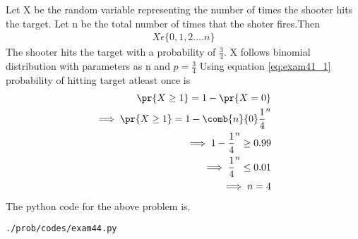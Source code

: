 Let X be the random variable representing the number of times the shooter hits the target. Let n be the total number of times that the shoter fires.Then
\begin{align}
X \epsilon \{0,1,2....n\}
\end{align}
The shooter hits the target with a probability of $\frac{3}{4}$. X follows binomial distribution with parameters as n and $p=\frac{3}{4}$
Using equation \eqref{eq:exam41_1} probability of hitting target atleast once is
\begin{align}
\pr{X \geq 1} = 1-\pr{X=0}
\\
\implies \pr{X \geq 1} = 1-\comb{n}{0}\frac{1}{4}^{n}
\\
\implies 1-\frac{1}{4}^{n} \geq 0.99
\\
\implies \frac{1}{4}^{n} \leq 0.01
\\
\implies n=4
\end{align}
The python code for the above problem is,
\begin{lstlisting}
./prob/codes/exam44.py
\end{lstlisting}
